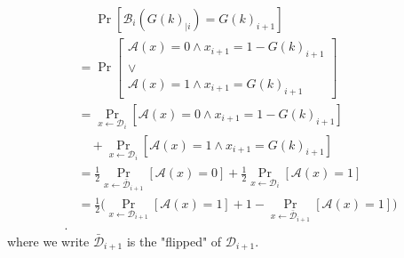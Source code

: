 \documentclass[./main]{subfiles}
\begin{document}
\begin{prv}
\begin{align*}
      &\phantom{={}}\Pr[\mathcal{B}_i(G(k)_{|i}) = G(k)_{i+1}]\\
      &= \Pr \left[
        \begin{array}{c}
          \mathcal{A}(x) = 0 \land x_{i+1} = 1 - G(k)_{i+1}\\
          \lor\\
          \mathcal{A}(x) = 1 \land x_{i+1} = G(k)_{i+1}
        \end{array}
      \right] \\
      &= \Pr_{x \gets \mathcal{D}_i} [\mathcal{A}(x) = 0 \land x_{i+1} = 1 - G(k)_{i+1}]\\
      &\quad + \Pr_{x\gets \mathcal{D}_i}[\mathcal{A}(x) = 1 \land x_{i+1} = G(k)_{i+1}]\\
      &=
      \frac{1}{2} \Pr_{x \gets \bar{\mathcal{D}}_{i+1}}[\mathcal{A}(x) = 0]
      + \frac{1}{2} \Pr_{x \gets \mathcal{D}_{i}}[\mathcal{A}(x) = 1]\\
      &= \frac{1}{2}\big(
        \Pr_{x \gets \mathcal{D}_{i+1}}[\mathcal{A}(x) = 1]
        + 1 - \Pr_{x \gets \bar{\mathcal{D}}_{i+1}}[\mathcal{A}(x) = 1]
      \big) \\
    .\end{align*}
    where we write $\bar{\mathcal{D}}_{i+1}$ is the "flipped" of $\mathcal{D}_{i+1}$.
  \end{prv}
\end{document}
